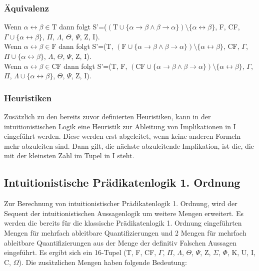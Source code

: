 \subsubsection{Äquivalenz}
Wenn $\alpha\leftrightarrow\beta\in\textrm{T}$ dann folgt S'=($(\textrm{T}\cup\lbrace\alpha\rightarrow\beta\wedge\beta\rightarrow\alpha\rbrace)\setminus\lbrace\alpha\leftrightarrow\beta\rbrace$, F, CF, $\Gamma\cup\lbrace\alpha\leftrightarrow\beta\rbrace$, $\Pi$, $\Lambda$, $\Theta$, $\Psi$, Z, I).\\
Wenn $\alpha\leftrightarrow\beta\in\textrm{F}$ dann folgt S'=(T, $(\textrm{F}\cup\lbrace\alpha\rightarrow\beta\wedge\beta\rightarrow\alpha\rbrace)\setminus\lbrace\alpha\leftrightarrow\beta\rbrace$, CF, $\Gamma$, $\Pi\cup\lbrace\alpha\leftrightarrow\beta\rbrace$, $\Lambda$, $\Theta$, $\Psi$, Z, I).\\
Wenn $\alpha\leftrightarrow\beta\in\textrm{CF}$ dann folgt S'=(T, F, $(\textrm{CF}\cup\lbrace\alpha\rightarrow\beta\wedge\beta\rightarrow\alpha\rbrace)\setminus\lbrace\alpha\leftrightarrow\beta\rbrace$, $\Gamma$, $\Pi$, $\Lambda\cup\lbrace\alpha\leftrightarrow\beta\rbrace$, $\Theta$, $\Psi$, Z, I).

\subsubsection{Heuristiken}
Zusätzlich zu den bereits zuvor definierten Heuristiken, kann in der intuitionistischen Logik eine Heuristik zur Ableitung von Implikationen in I eingeführt werden. Diese werden erst abgeleitet, wenn keine anderen Formeln mehr abzuleiten sind. Dann gilt, die nächste abzuleitende Implikation, ist die, die mit der kleinsten Zahl im Tupel in I steht.


\subsection{Intuitionistische Prädikatenlogik 1. Ordnung}
Zur Berechnung von intuitionistischer Prädikatenlogik 1. Ordnung, wird der Sequent der intuitionistischen Aussagenlogik um weitere Mengen erweitert. Es werden die bereits für die klassische Prädikatenlogik 1. Ordnung eingeführten Mengen für mehrfach ableitbare Quantifizierungen und 2 Mengen für mehrfach ableitbare Quantifizierungen aus der Menge der definitiv Falschen Aussagen eingeführt. Es ergibt sich ein 16-Tupel (T, F, CF, $\Gamma$, $\Pi$, $\Lambda$, $\Theta$, $\Psi$, Z, $\Sigma$, $\Phi$, K, U, I, C, $\Omega$). Die zusätzlichen Mengen haben folgende Bedeutung:


